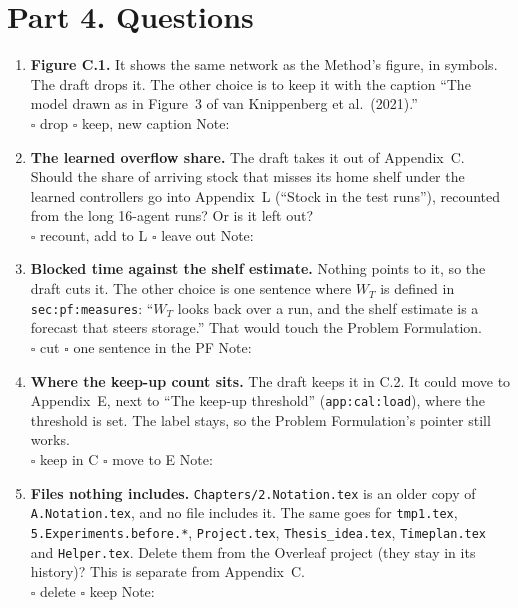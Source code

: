 \documentclass[11pt,a4paper]{article}
\newcommand{\lref}[1]{{\small\texttt{#1}}}
\begin{document}
\section*{Part 4. Questions}
\begin{enumerate}
  \item \textbf{Figure C.1.} It shows the same network as the Method's
        figure, in symbols. The draft drops it. The other choice is to keep
        it with the caption ``The model drawn as in Figure~3 of van
        Knippenberg et al.\ (2021).''
        \\ \hspace*{1em}$\square$ drop \quad $\square$ keep, new caption \quad Note:
  \item \textbf{The learned overflow share.} The draft takes it out of
        Appendix~C. Should the share of arriving stock that misses its home
        shelf under the learned controllers go into Appendix~L (``Stock in
        the test runs''), recounted from the long 16-agent runs? Or is it
        left out?
        \\ \hspace*{1em}$\square$ recount, add to L \quad $\square$ leave out \quad Note:
  \item \textbf{Blocked time against the shelf estimate.} Nothing points
        to it, so the draft cuts it. The other choice is one sentence where
        $W_T$ is defined in \lref{sec:pf:measures}: ``$W_T$ looks back over a
        run, and the shelf estimate is a forecast that steers storage.'' That
        would touch the Problem Formulation.
        \\ \hspace*{1em}$\square$ cut \quad $\square$ one sentence in the PF \quad Note:
  \item \textbf{Where the keep-up count sits.} The draft keeps it in C.2.
        It could move to Appendix~E, next to ``The keep-up threshold''
        (\lref{app:cal:load}), where the threshold is set. The label stays,
        so the Problem Formulation's pointer still works.
        \\ \hspace*{1em}$\square$ keep in C \quad $\square$ move to E \quad Note:
  \item \textbf{Files nothing includes.} \texttt{Chapters/2.Notation.tex} is
        an older copy of \texttt{A.Notation.tex}, and no file includes it.
        The same goes for \texttt{tmp1.tex}, \texttt{5.Experiments.before.*},
        \texttt{Project.tex}, \texttt{Thesis\_idea.tex},
        \texttt{Timeplan.tex} and \texttt{Helper.tex}. Delete them from the
        Overleaf project (they stay in its history)? This is separate from
        Appendix~C.
        \\ \hspace*{1em}$\square$ delete \quad $\square$ keep \quad Note:
\end{enumerate}
\end{document}
